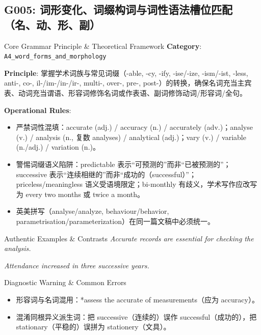 \subsection{G005: 词形变化、词缀构词与词性语法槽位匹配（名、动、形、副）}\label{sec:rule:G005}
\begin{ConceptBox}{Core Grammar Principle \& Theoretical Framework}
\textbf{Category}: \texttt{A4\_word\_forms\_and\_morphology}\par\vspace{3pt}
\textbf{Principle}: 掌握学术词族与常见词缀（-able, -cy, -ify, -ise/-ize, -ism/-ist, -less, anti-, co-, il-/im-/in-/ir-, multi-, over-, pre-, post-）的转换，确保名词充当主宾表、动词充当谓语、形容词修饰名词或作表语、副词修饰动词/形容词/全句。\par\vspace{4pt}
\textbf{Operational Rules}:
\begin{itemize}[leftmargin=1.5em, itemsep=1pt]
  \item 严禁词性混填：accurate (adj.) / accuracy (n.) / accurately (adv.)；analyse (v.) / analysis (n., 复数 analyses) / analytical (adj.)；vary (v.) / variable (n./adj.) / variation (n.)。
  \item 警惕词缀语义陷阱：predictable 表示“可预测的”而非“已被预测的”；successive 表示“连续相继的”而非“成功的（successful）”；priceless/meaningless 语义受语境限定；bi-monthly 有歧义，学术写作应改写为 every two months 或 twice a month。
  \item 英美拼写（analyse/analyze, behaviour/behavior, parametrisation/parameterization）在同一篇文稿中必须统一。
\end{itemize}
\end{ConceptBox}
\begin{ExampleBox}{Authentic Examples \& Contrasts}
\textit{Accurate records are essential for checking the analysis.}\par\vspace{2pt}
\textit{Attendance increased in three successive years.}\par\vspace{2pt}
\end{ExampleBox}
\begin{TipBox}{Diagnostic Warning \& Common Errors}
\begin{itemize}[leftmargin=1.5em, itemsep=1pt]
  \item 形容词与名词混用：*assess the accurate of measurements（应为 accuracy）。
  \item 混淆同根异义派生词：把 successive（连续的）误作 successful（成功的），把stationary（平稳的）误拼为 stationery（文具）。
\end{itemize}
\end{TipBox}
\vspace{6pt}
